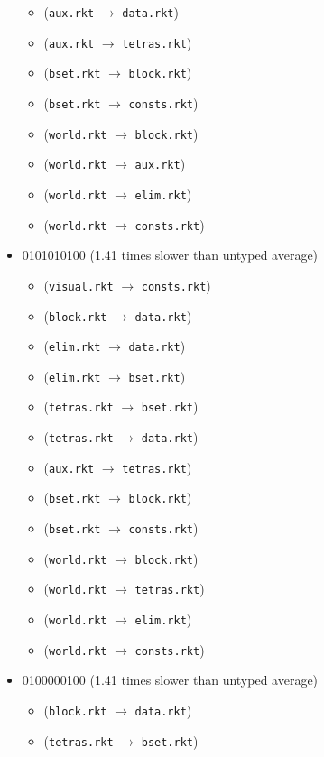 \documentclass{article}
\newcommand{\mono}[1]{\texttt{#1}}
\begin{document}
\begin{itemize}
\begin{itemize}
  \item (\mono{aux.rkt} $\rightarrow$ \mono{data.rkt})
  \item (\mono{aux.rkt} $\rightarrow$ \mono{tetras.rkt})
  \item (\mono{bset.rkt} $\rightarrow$ \mono{block.rkt})
  \item (\mono{bset.rkt} $\rightarrow$ \mono{consts.rkt})
  \item (\mono{world.rkt} $\rightarrow$ \mono{block.rkt})
  \item (\mono{world.rkt} $\rightarrow$ \mono{aux.rkt})
  \item (\mono{world.rkt} $\rightarrow$ \mono{elim.rkt})
  \item (\mono{world.rkt} $\rightarrow$ \mono{consts.rkt})
  \end{itemize}
\item 0101010100 (1.41 times slower than untyped average)
  \begin{itemize}
  \item (\mono{visual.rkt} $\rightarrow$ \mono{consts.rkt})
  \item (\mono{block.rkt} $\rightarrow$ \mono{data.rkt})
  \item (\mono{elim.rkt} $\rightarrow$ \mono{data.rkt})
  \item (\mono{elim.rkt} $\rightarrow$ \mono{bset.rkt})
  \item (\mono{tetras.rkt} $\rightarrow$ \mono{bset.rkt})
  \item (\mono{tetras.rkt} $\rightarrow$ \mono{data.rkt})
  \item (\mono{aux.rkt} $\rightarrow$ \mono{tetras.rkt})
  \item (\mono{bset.rkt} $\rightarrow$ \mono{block.rkt})
  \item (\mono{bset.rkt} $\rightarrow$ \mono{consts.rkt})
  \item (\mono{world.rkt} $\rightarrow$ \mono{block.rkt})
  \item (\mono{world.rkt} $\rightarrow$ \mono{tetras.rkt})
  \item (\mono{world.rkt} $\rightarrow$ \mono{elim.rkt})
  \item (\mono{world.rkt} $\rightarrow$ \mono{consts.rkt})
  \end{itemize}
\item 0100000100 (1.41 times slower than untyped average)
  \begin{itemize}
  \item (\mono{block.rkt} $\rightarrow$ \mono{data.rkt})
  \item (\mono{tetras.rkt} $\rightarrow$ \mono{bset.rkt})

\end{itemize}
\end{itemize}
\end{document}
